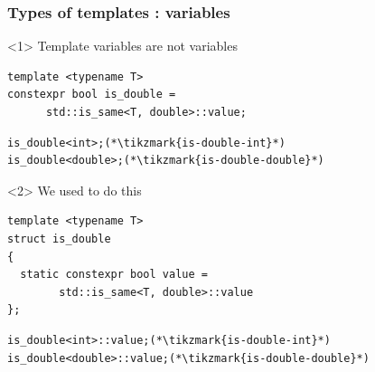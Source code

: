 \documentclass[14pt]{beamer}
\begin{document}
\begin{frame}[fragile]
  \frametitle{Types of templates : variables}

  \begin{onlyenv}<1>
    Template variables are not variables

    \vspace{.5cm}

    \begin{lstlisting}[basicstyle=\codefontsize{12pt}]
template <typename T>
constexpr bool is_double = 
      std::is_same<T, double>::value;
    \end{lstlisting}

    \vspace{.5cm}

    \begin{lstlisting}[basicstyle=\codefontsize{12pt}]
is_double<int>;(*\tikzmark{is-double-int}*)
is_double<double>;(*\tikzmark{is-double-double}*)
    \end{lstlisting}

    \nointerlineskip

    \CPPFourteen
  \end{onlyenv}

  \begin{onlyenv}<2>
    We used to do this

    \vspace{.5cm}

    \begin{lstlisting}[basicstyle=\codefontsize{12pt}]
template <typename T>
struct is_double
{
  static constexpr bool value = 
        std::is_same<T, double>::value
};
    \end{lstlisting}

    \vspace{.5cm}

    \begin{lstlisting}[basicstyle=\codefontsize{12pt}]
is_double<int>::value;(*\tikzmark{is-double-int}*)
is_double<double>::value;(*\tikzmark{is-double-double}*)
    \end{lstlisting}


\end{onlyenv}
\end{frame}
\end{document}
